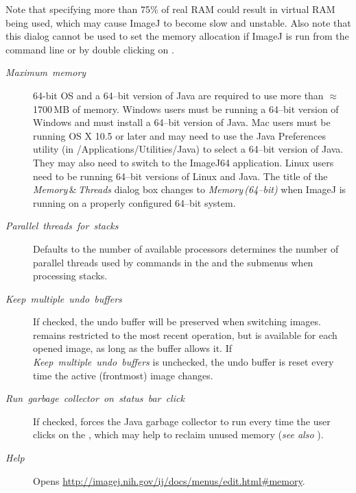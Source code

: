 Note that specifying more than 75\% of real RAM
could result in virtual RAM being used, which may cause ImageJ to
become slow and unstable. Also note that this dialog cannot be used
to set the memory allocation if ImageJ is run from the command line
or by double clicking on .
\begin{description}
\item [{\emph{Maximum}\ \emph{memory}}] 64-bit
OS and a 64--bit version of Java are required to use
more than $\approx$1700\,MB of memory. Windows users must be running
a 64--bit version of Windows and must install a 64--bit version of
Java. Mac users must be running OS X 10.5 or later and may need to
use the Java Preferences utility (in /Applications/Utilities/Java)
to select a 64--bit version of Java. They may also need to switch
to the ImageJ64 application. Linux users need to be running 64--bit
versions of Linux and Java. The title of the \emph{Memory}\,\&\,\emph{Threads}
dialog box changes to \emph{Memory}\,\emph{(64--bit)} when ImageJ
is running on a properly configured 64--bit system.
\item [{\emph{Parallel}\ \emph{threads}\ \emph{for}\ \emph{stacks}}] Defaults
to the number of available processors determines the number of parallel
threads used by commands in the 
and the  submenus
when processing stacks.
\item [{\emph{Keep\ multiple\ undo\ buffers}}] If checked, the undo
buffer will be preserved when switching images. 
remains restricted to the most recent operation, but is available
for each opened image, as long as the buffer allows it. If \emph{Keep\ multiple\ undo\ buffers}
is unchecked, the undo buffer is reset every time the active (frontmost)
image changes.
\item [{\emph{Run\ garbage\ collector\ on\ status\ bar\ click}}] If
checked, forces the Java garbage collector to run every time the user
clicks on the , which may help to reclaim
unused memory (\emph{see also} \textsf{}).
\item [{\emph{Help}}] Opens \url{http://imagej.nih.gov/ij/docs/menus/edit.html#memory}.
\end{description}

